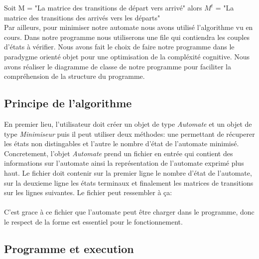 \documentclass[a4paper]{article}
\begin{document}
Soit M = "La matrice des transitions de départ vers arrivé"
alors $M^t$ = "La matrice des transitions des arrivés vers les départs"\\

Par ailleurs, pour minimiser notre automate nous avons utilisé l'algorithme vu
en cours. Dans notre programme nous utiliserons une file qui contiendra les
couples d'états à vérifier. Nous avons fait le choix de faire notre programme
dans le paradygme orienté objet pour une optimisation de la compléxité cognitive.
Nous avons réaliser le diagramme de classe de notre programme pour faciliter
la compréhension de la structure du programme.



\subsection{Principe de l'algorithme}

En premier lieu, l'utilisateur doit créer un objet de type \textit{Automate} et 
un objet de type \textit{Minimiseur} puis il peut utiliser deux méthodes:
une permettant de récuperer les états non distingables et l'autre le nombre
d'état de l'automate minimisé.\\

Concretement, l'objet \textit{Automate} prend un fichier en entrée qui contient des informations sur
l'automate ainsi la représentation de l'automate exprimé plus haut. Le fichier 
doit contenir sur la premier ligne le nombre d'état de l'automate, sur la deuxieme
ligne les états terminaux et finalement les matrices de transitions sur les lignes suivantes.
Le fichier peut ressembler à ça:\\

\fbox{
	
}\\

C'est grace à ce fichier que l'automate peut être charger dans le programme, donc le respect
de la forme est essentiel pour le fonctionnement.

\subsection{Programme et execution}
\end{document}
